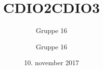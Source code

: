 \documentclass[12pt,a4paper]{article}
\title{CDIO2}
\author{Gruppe 16}
\date{10. november 2017}
\author{Gruppe 16}
\title{CDIO3}
\begin{document}
        
        \pagebreak
        
        \pagebreak
        
        \pagebreak
        
        \pagebreak
    
\end{document}

